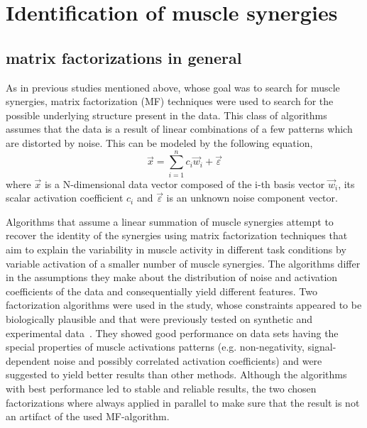 



\section{Identification of muscle synergies} %
\label{sg:sec:factorization}

\subsection{matrix factorizations in general} %
\label{sg:sub:mf}

As in previous studies mentioned above, whose goal was to search for muscle synergies, matrix factorization (MF) techniques were used to search for the possible underlying structure present in the data. This class of algorithms assumes that the data is a result of linear combinations of a few patterns which are distorted by noise. This can be modeled by the following equation,
\begin{equation}
	\vec{x} = \sum_{i=1}^n c_{i} \vec{w}_{i} + \vec{\varepsilon}
\end{equation}
where $\vec{x}$ is a N-dimensional data vector composed of the i-th basis vector $\vec{w}_{i}$, its scalar activation coefficient $c_{i}$ 
and $\vec{\varepsilon}$ is an unknown noise component vector.


Algorithms that assume a linear summation of muscle synergies attempt to recover the identity of the synergies using matrix factorization techniques that aim to explain the variability in muscle activity in different task conditions by variable activation of a smaller number of muscle synergies. The algorithms differ in the assumptions they make about the distribution of noise and activation coefficients of the data and consequentially yield different features. Two factorization algorithms were used in the study, whose constraints appeared to be biologically plausible and that were previously tested on synthetic and experimental data~\citep{Tresch:2006p3766}. They showed good performance on data sets having the special properties of muscle activations patterns (e.g. non-negativity, signal-dependent noise and possibly correlated activation coefficients) and were suggested to yield better results than other methods. Although the algorithms with best performance led to stable and reliable results, the two chosen factorizations where always applied in parallel to make sure that the result is not an artifact of the used MF-algorithm. 

